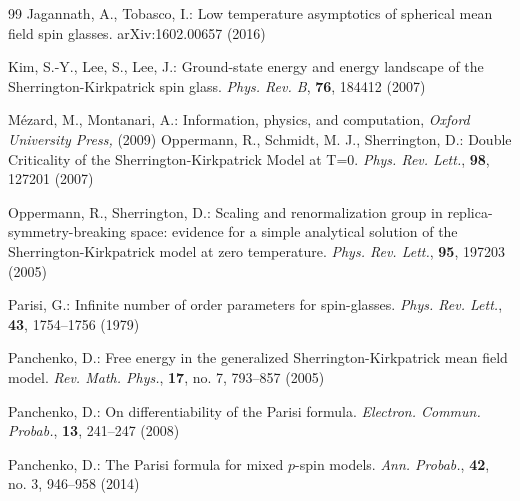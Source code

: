 \documentclass[12pt]{article}
\newenvironment{Proof of lemma}{\noindent{\bf Proof of Lemma}}{\hfill$\Box$\newline}
\newenvironment{Proof of theorem}{\noindent{\bf Proof of Theorem}}{\hfill{\footnotesize${\square}$}\newline}
\newenvironment{Proof of theorems}{\noindent{\bf Proof of Theorems}}{\hfill$\Box$\newline}
\newenvironment{Proof of proposition}{\noindent{\bf Proof of Proposition}}{\hfill$\Box$\newline}
\newenvironment{Proof of propositions}{\noindent{\bf Proof of Propositions}}{\hfill$\Box$\newline}
\newenvironment{Proof of exercise}{\noindent{\it Proof of Exercise:}}{\hfill$\Box$}
\begin{document}
\begin{thebibliography}{99}
  		Jagannath, A., Tobasco, I.: Low temperature asymptotics of spherical mean field spin glasses. arXiv:1602.00657 (2016)
  		
%  		
		 Kim, S.-Y., Lee, S., Lee, J.: Ground-state energy and energy landscape of the Sherrington-Kirkpatrick spin glass. {\it Phys. Rev. B}, {\bf 76}, 184412 (2007)
		
		
		 M\'{e}zard, M., Montanari, A.: Information, physics, and computation, {\it Oxford University Press,} (2009)
%  		
%  		
%  		
		  Oppermann, R., Schmidt, M. J., Sherrington, D.: Double Criticality of the Sherrington-Kirkpatrick Model at T=0. {\it Phys. Rev. Lett.}, {\bf 98}, 127201 (2007)
		
		 Oppermann, R., Sherrington, D.: Scaling and renormalization group in replica-symmetry-breaking space: evidence for a simple analytical solution of the Sherrington-Kirkpatrick model at zero temperature.  {\it Phys. Rev. Lett.}, {\bf 95}, 197203 (2005)
		
		
		
  		Parisi, G.:  Infinite number of order parameters for spin-glasses. {\it Phys. Rev. Lett.}, {\bf 43}, 1754--1756 (1979)
  		
  		Panchenko, D.:  Free energy in the generalized Sherrington-Kirkpatrick mean field model. {\it Rev. Math. Phys.}, {\bf 17}, no. 7, 793--857 (2005)
  		
  		Panchenko, D.: On differentiability of the Parisi formula.  {\it Electron. Commun. Probab.}, {\bf 13}, 241--247 (2008)
  		
  		
%  		
%  		
  		Panchenko, D.: The Parisi formula for mixed $p$-spin models. {\it Ann. Probab.}, {\bf 42}, no. 3, 946--958 (2014)
  		

\end{thebibliography}
\end{document}
